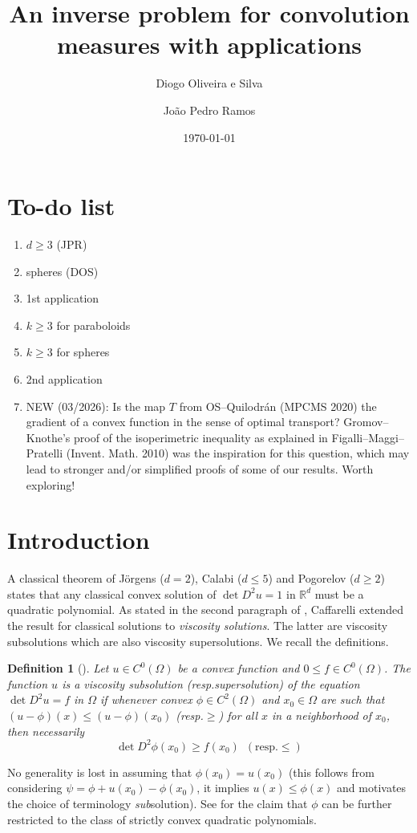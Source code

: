 \documentclass[11pt]{amsart}
\title{An inverse problem for convolution 
measures with applications}
\author{Diogo Oliveira e Silva}
\author{João Pedro Ramos}
\date{\today}
\def\R{\mathbb{R}}
\newtheorem{definition}[theorem]{Definition}
\begin{document}
\begin{abstract}
\end{abstract}

\maketitle

\section{To-do list}
\begin{enumerate}
    \item $d\geq 3$ (JPR)
    \item spheres (DOS)
    \item 1st application
    \item $k\geq 3$ for paraboloids
    \item $k\geq 3$ for spheres
    \item 2nd application
    \item NEW (03/2026): Is the map $T$ from OS--Quilodrán (MPCMS 2020) the gradient of a convex function in the sense of optimal transport? Gromov--Knothe's proof of the isoperimetric inequality as explained in Figalli--Maggi--Pratelli (Invent. Math. 2010) was the inspiration for this question, which may lead to stronger and/or simplified proofs of some of our results. Worth exploring!
\end{enumerate}

\section{Introduction}
A classical theorem of Jörgens ($d=2$), Calabi ($d\leq 5$) and Pogorelov ($d\geq 2$) states that any classical convex solution of $\det D^2u=1$ in $\R^d$ must be a quadratic polynomial. As stated in the second paragraph of \cite{CL03}, Caffarelli extended the result for classical solutions to {\it viscosity solutions}. The latter are viscosity subsolutions which are also viscosity supersolutions. We recall the definitions.
\begin{definition}[\cite{Gu16}]
    Let $u\in C^0(\Omega)$ be a convex function and $0\leq f\in C^0(\Omega)$. The function $u$ is a viscosity subsolution (resp.\@ supersolution) of the equation $\det D^2 u=f$ in $\Omega$ if whenever convex $\phi\in C^2(\Omega)$ and $x_0\in\Omega$ are such that $(u-\phi)(x)\leq (u-\phi)(x_0)$ (resp.\@ $\geq$) for all $x$ in a neighborhood of $x_0$, then necessarily 
    \[\det D^2\phi(x_0)\geq f(x_0)\,\,\,(\text{resp.} \leq)\]
\end{definition}
\noindent No generality is lost in assuming that $\phi(x_0)=u(x_0)$ (this follows from considering $\psi=\phi+u(x_0)-\phi(x_0)$, it implies $u(x)\leq\phi(x)$ and motivates the choice of terminology {\it sub}solution). See \cite[Remark 1.3.3.]{Gu16} for the claim that $\phi$ can be further restricted to the class of strictly convex quadratic polynomials.\\
\end{document}

